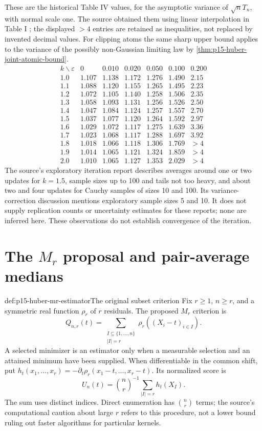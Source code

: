 These are the historical Table IV values, for the asymptotic variance
of \(\sqrt nT_n\), with normal scale one. The source obtained them
using linear interpolation in Table I
\cite[pp.~99--100]{Huber1964RobustLocation}; the displayed
\(>4\) entries are retained as inequalities, not replaced by invented
decimal values.
For clipping atoms the same sharp upper bound applies to the
variance of the possibly non-Gaussian limiting law by
\cref{thm:p15-huber-joint-atomic-bound}.
\[
\begin{array}{c|rrrrrr}
k\backslash\varepsilon&0&0.010&0.020&0.050&0.100&0.200\\\hline
1.0&1.107&1.138&1.172&1.276&1.490&2.15\\
1.1&1.088&1.120&1.155&1.265&1.495&2.23\\
1.2&1.072&1.105&1.140&1.258&1.506&2.35\\
1.3&1.058&1.093&1.131&1.256&1.526&2.50\\
1.4&1.047&1.084&1.124&1.257&1.557&2.70\\
1.5&1.037&1.077&1.120&1.264&1.592&2.97\\
1.6&1.029&1.072&1.117&1.275&1.639&3.36\\
1.7&1.023&1.068&1.117&1.288&1.697&3.92\\
1.8&1.018&1.066&1.118&1.306&1.769&>4\\
1.9&1.014&1.065&1.121&1.324&1.859&>4\\
2.0&1.010&1.065&1.127&1.353&2.029&>4
\end{array}
\]
The source's exploratory iteration report describes averages around
one or two updates for \(k=1.5\), sample sizes up to 100 and tails
not too heavy, and about two and four updates for Cauchy samples
of sizes 10 and 100. Its variance-correction discussion mentions
exploratory sample sizes 5 and 10. It does not supply replication
counts or uncertainty estimates for these reports; none are inferred
here. These observations do not establish convergence of the iteration.

\section{The \(M_r\) proposal and pair-average medians}
\label{sec:p15-huber-mr}

\begin{hbdefinition}{def:p15-huber-mr-estimator}{The original subset criterion}
Fix \(r\geq1\), \(n\geq r\), and a symmetric real function
\(\rho_r\) of \(r\) residuals. The proposed \(M_r\) criterion is
\[
 Q_{n,r}(t)=\sum_{\substack{I\subseteq\{1,\ldots,n\}\\|I|=r}}
            \rho_r((X_i-t)_{i\in I}).
\]
A selected minimizer is an estimator only when a measurable
selection and an attained minimum have been supplied.
When differentiable in the common shift, put
\(h_t(x_1,\ldots,x_r)=-\partial_t\rho_r(x_1-t,\ldots,x_r-t)\).
Its normalized score is
\[
 U_n(t)=\binom nr^{-1}\sum_{|I|=r}h_t(X_I).
\]
The sum uses distinct indices. Direct enumeration has \(\binom nr\)
terms; the source's computational caution about large \(r\)
refers to this procedure, not a lower bound ruling out faster
algorithms for particular kernels.
\end{hbdefinition}

